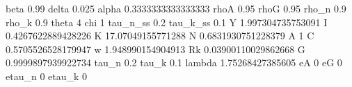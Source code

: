 beta 0.99
delta 0.025
alpha 0.3333333333333333
rhoA 0.95
rhoG 0.95
rho_n 0.9
rho_k 0.9
theta 4
chi 1
tau_n_ss 0.2
tau_k_ss 0.1
Y 1.997304735753091
I 0.4267622889428226
K 17.07049155771288
N 0.6831930751228379
A 1
C 0.5705526528179947
w 1.948990154904913
Rk 0.03900110029862668
G 0.9999897939922734
tau_n 0.2
tau_k 0.1
lambda 1.75268427385605
eA 0
eG 0
etau_n 0
etau_k 0
